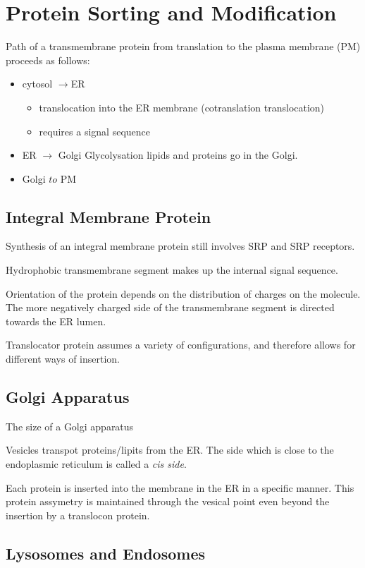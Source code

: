 \documentclass[11pt]{scrartcl}
\begin{document}
\section{Protein Sorting and Modification}

Path of a transmembrane protein from translation to the plasma membrane (PM) proceeds as follows:
\begin{itemize}
\item cytosol $\to$ER
  \begin{itemize}
  \item translocation into the ER membrane (cotranslation translocation)
  \item requires a signal sequence
  \end{itemize}
\item ER $\to$ Golgi
  Glycolysation lipids and proteins go in the Golgi.
\item Golgi $to$ PM
\end{itemize}
\subsection{Integral Membrane Protein}

Synthesis of an integral membrane protein still involves SRP and SRP receptors.

Hydrophobic transmembrane segment makes up the internal signal
sequence.

Orientation of the protein depends on the distribution of charges on the molecule. The more negatively charged side of the transmembrane segment is directed towards the ER lumen. 

Translocator protein assumes a variety of configurations, and therefore allows for different ways of insertion.

\subsection{Golgi Apparatus}

The size of a Golgi apparatus

Vesicles transpot proteins/lipits from the ER. The side which is close
to the endoplasmic reticulum is called a \textit{cis side}.

Each protein is inserted into the membrane in the ER in a specific
manner. This protein assymetry is maintained through the vesical
point even beyond the insertion by a translocon protein.

\subsection{Lysosomes and Endosomes}
\end{document}
